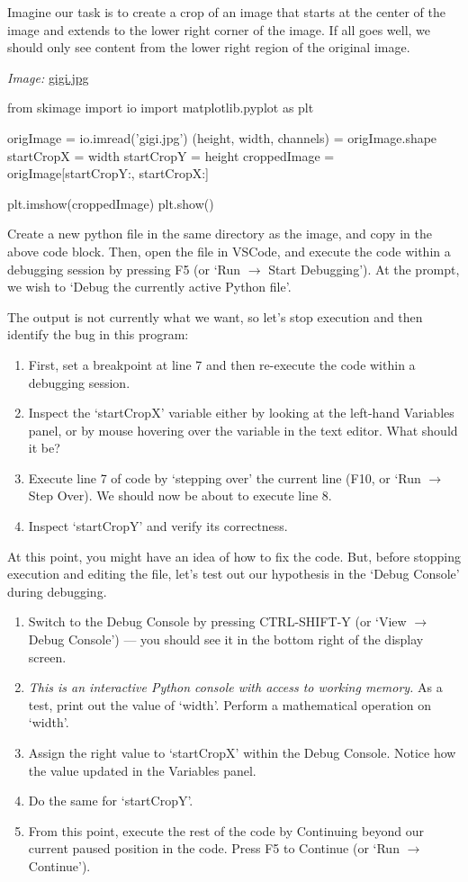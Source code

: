\documentclass[11pt]{article}
\begin{document}
Imagine our task is to create a crop of an image that starts at the center of the image and extends to the lower right corner of the image. If all goes well, we should only see content from the lower right region of the original image.

\emph{Image:} \href{gigi.jpg}{gigi.jpg}

\begin{python}
from skimage import io
import matplotlib.pyplot as plt

origImage = io.imread('gigi.jpg')
(height, width, channels) = origImage.shape
startCropX = width %
startCropY = height %
croppedImage = origImage[startCropY:, startCropX:]

plt.imshow(croppedImage)
plt.show()
\end{python}

Create a new python file in the same directory as the image, and copy in the above code block. Then, open the file in VSCode, and execute the code within a debugging session by pressing F5 (or `Run $\rightarrow$ Start Debugging'). At the prompt, we wish to `Debug the currently active Python file'.

The output is not currently what we want, so let's stop execution and then identify the bug in this program:
\begin{enumerate}
    \item First, set a breakpoint at line 7 and then re-execute the code within a debugging session.
    \item Inspect the `startCropX' variable either by looking at the left-hand Variables panel, or by mouse hovering over the variable in the text editor. What should it be?
    \item Execute line 7 of code by `stepping over' the current line (F10, or `Run $\rightarrow$ Step Over). We should now be about to execute line 8.
    \item Inspect `startCropY' and verify its correctness.
\end{enumerate}

At this point, you might have an idea of how to fix the code. But, before stopping execution and editing the file, let's test out our hypothesis in the `Debug Console' during debugging.

\begin{enumerate}
    \item Switch to the Debug Console by pressing CTRL-SHIFT-Y (or `View $\rightarrow$ Debug Console') --- you should see it in the bottom right of the display screen.
    \item \emph{This is an interactive Python console with access to working memory.} As a test, print out the value of `width'. Perform a mathematical operation on `width'.
    \item Assign the right value to `startCropX' within the Debug Console. Notice how the value updated in the Variables panel.
    \item Do the same for `startCropY'.
    \item From this point, execute the rest of the code by Continuing beyond our current paused position in the code. Press F5 to Continue (or `Run $\rightarrow$ Continue').
\end{enumerate}
\end{document}
